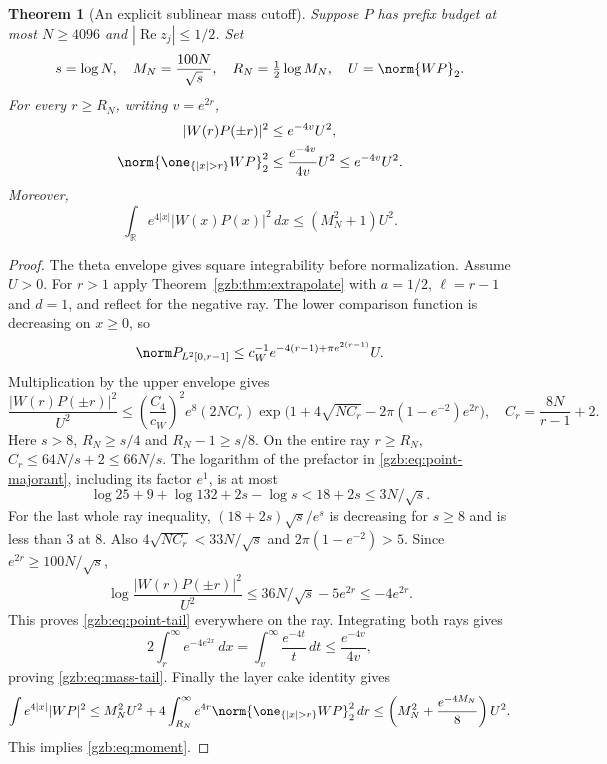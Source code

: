 \documentclass[11pt,a4paper]{article}
\numberwithin{equation}{section}
\newtheorem{theorem}{Theorem}[section]
\theoremstyle{definition}\newtheorem{definition}[theorem]{Definition}
\theoremstyle{remark}\newtheorem{remark}[theorem]{Remark}
\newcommand{\R}{\mathbb R}\newcommand{\C}{\mathbb C}\newcommand{\N}{\mathbb N}
\DeclareMathOperator{\Rea}{Re}\DeclareMathOperator{\Ima}{Im}
\begin{document}
\begin{theorem}[An explicit sublinear mass cutoff]\label{gzb:thm:tail}
Suppose $P$ has prefix budget at most $N\ge4096$ and
$|\Rea z_j|\le1/2$. Set
\begin{equation}\label{gzb:eq:cutoff}
 s=\log N,\quad M_N=\frac{100N}{\sqrt s},\quad
 R_N=\tfrac12\log M_N,\quad U=\norm{WP}_2.
\end{equation}
For every $r\ge R_N$, writing $v=e^{2r}$,
\begin{align}
 |W(r)P(\pm r)|^2&\le e^{-4v}U^2,\label{gzb:eq:point-tail}\\
 \norm{\one_{\{|x|>r\}}WP}_2^2
     &\le\frac{e^{-4v}}{4v}U^2\le e^{-4v}U^2.\label{gzb:eq:mass-tail}
\end{align}
Moreover,
\begin{equation}\label{gzb:eq:moment}
 \int_\R e^{4|x|}|W(x)P(x)|^2\,dx\le(M_N^2+1)U^2.
\end{equation}
\end{theorem}
\begin{proof}
The theta envelope gives square integrability before normalization.
Assume $U>0$. For $r>1$ apply Theorem~\ref{gzb:thm:extrapolate} with
$a=1/2$, $\ell=r-1$ and $d=1$, and reflect for the negative ray.
The lower comparison function is decreasing on $x\ge0$, so
\[
 \norm P_{L^2[0,r-1]}
       \le c_W^{-1}e^{-4(r-1)+\pi e^{2(r-1)}}U.
\]
Multiplication by the upper envelope gives
\begin{equation}\label{gzb:eq:point-majorant}
 \frac{|W(r)P(\pm r)|^2}{U^2}
 \le\left(\frac{C_4}{c_W}\right)^2e^8(2NC_r)
  \exp\bigl(1+4\sqrt{NC_r}-2\pi(1-e^{-2})e^{2r}\bigr),
 \quad C_r=\frac{8N}{r-1}+2.
\end{equation}
Here $s>8$, $R_N\ge s/4$ and $R_N-1\ge s/8$.
On the entire ray $r\ge R_N$, $C_r\le64N/s+2\le66N/s$.
The logarithm of the prefactor in \eqref{gzb:eq:point-majorant}, including
its factor $e^1$, is at most
\[
 \log25+9+\log132+2s-\log s<18+2s\le3N/\sqrt s.
\]
For the last whole ray inequality,
$(18+2s)\sqrt s/e^s$ is decreasing for $s\ge8$ and is less than $3$ at $8$.
Also $4\sqrt{NC_r}<33N/\sqrt s$ and $2\pi(1-e^{-2})>5$.
Since $e^{2r}\ge100N/\sqrt s$,
\[
 \log\frac{|W(r)P(\pm r)|^2}{U^2}
       \le36N/\sqrt s-5e^{2r}\le-4e^{2r}.
\]
This proves \eqref{gzb:eq:point-tail} everywhere on the ray.
Integrating both rays gives
\[
 2\int_r^\infty e^{-4e^{2x}}\,dx
       =\int_v^\infty\frac{e^{-4t}}t\,dt\le\frac{e^{-4v}}{4v},
\]
proving \eqref{gzb:eq:mass-tail}.
Finally the layer cake identity gives
\[
 \int e^{4|x|}|WP|^2
 \le M_N^2U^2+4\int_{R_N}^\infty
              e^{4r}\norm{\one_{\{|x|>r\}}WP}_2^2\,dr
 \le\left(M_N^2+\frac{e^{-4M_N}}8\right)U^2.
\]
This implies \eqref{gzb:eq:moment}.
\end{proof}
\end{document}
